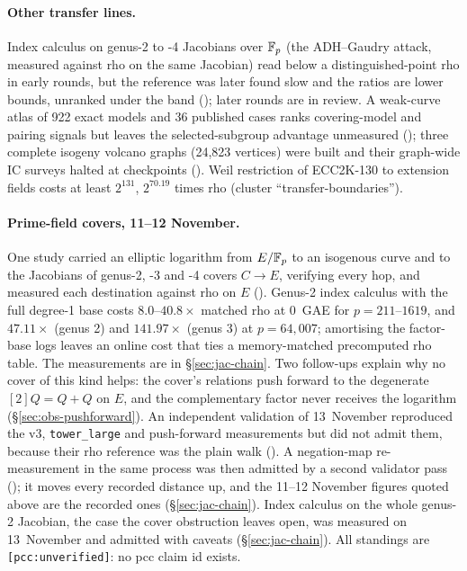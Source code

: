 \paragraph{Other transfer lines.} Index calculus on genus-2 to -4
Jacobians over $\mathbb{F}_p$ (the ADH--Gaudry attack, measured against rho on the
same Jacobian) read below a distinguished-point rho in early rounds, but the
reference was later found slow and the ratios are lower bounds, unranked
under the band ();
later rounds are in review. A weak-curve atlas of 922 exact models and 36
published cases ranks covering-model and pairing signals but leaves the
selected-subgroup advantage unmeasured
(); three complete isogeny
volcano graphs (24{,}823 vertices) were built and their graph-wide IC
surveys halted at checkpoints ().
Weil restriction of ECC2K-130 to extension fields costs at least $2^{131}$,
$2^{70.19}$ times rho (cluster ``transfer-boundaries'').

\paragraph{Prime-field covers, 11--12 November.} One study carried an
elliptic logarithm from $E/\mathbb{F}_p$ to an isogenous curve and to the Jacobians
of genus-2, -3 and -4 covers $C\to E$, verifying every hop, and measured each
destination against rho on $E$
(). Genus-2 index calculus
with the full degree-1 base costs $8.0$--$40.8\times$ matched rho at 0~GAE
for $p=211$--$1619$, and $47.11\times$ (genus 2) and $141.97\times$ (genus 3)
at $p=64{,}007$; amortising the factor-base logs leaves an online cost that
ties a memory-matched precomputed rho table. The measurements are in
\S\ref{sec:jac-chain}. Two follow-ups explain why no cover of this kind
helps: the cover's relations push forward to the degenerate
$[2]Q=Q+Q$ on $E$, and the complementary factor never receives the
logarithm (\S\ref{sec:obs-pushforward}). An independent validation of
13~November reproduced the v3, \texttt{tower\_large} and push-forward
measurements but did not admit them, because their rho reference was the
plain walk (). A negation-map
re-measurement in the same process was then admitted by a second validator
pass (); it moves
every recorded distance up, and the 11--12 November figures quoted above
are the recorded ones (\S\ref{sec:jac-chain}). Index calculus on the whole
genus-2 Jacobian, the case the cover obstruction leaves open, was measured
on 13~November and admitted with caveats (\S\ref{sec:jac-chain}). All
standings are \texttt{[pcc:unverified]}: no pcc claim id exists.

